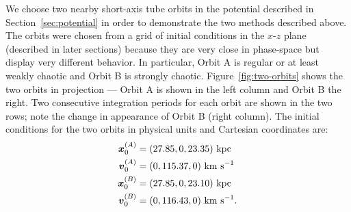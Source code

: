 \documentclass[letterpaper,12pt,preprint]{aastex}
\newcommand{\bs}[1]{\boldsymbol{#1}}
\begin{document}
We choose two nearby short-axis tube orbits in the potential described in Section~\ref{sec:potential} in order to demonstrate the two methods described above. The orbits were chosen from a grid of initial conditions in the $x$-$z$ plane (described in later sections) because they are very close in phase-space but display very different behavior. In particular, Orbit A is regular or at least weakly chaotic and Orbit B is strongly chaotic. Figure~\ref{fig:two-orbits} shows the two orbits in projection --- Orbit A is shown in the left column and Orbit B the right. Two consecutive integration periods for each orbit are shown in the two rows; note the change in appearance of Orbit B (right column). The initial conditions for the two orbits in physical units and Cartesian coordinates are:
\begin{align}
	\bs{x}_{0}^{(A)} &= (27.85, 0, 23.35)~{\rm kpc}\\
	\bs{v}_{0}^{(A)} &= (0, 115.37, 0)~{\rm km~s}^{-1}\\
	\bs{x}_{0}^{(B)} &= (27.85, 0, 23.10)~{\rm kpc}\\
	\bs{v}_{0}^{(B)} &= (0, 116.43, 0)~{\rm km~s}^{-1}.
\end{align}

%
\end{document}
